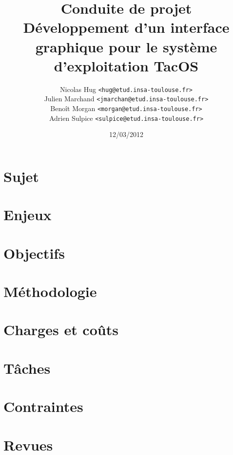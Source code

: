 \documentclass{article}
\title{Conduite de projet \\ Développement d'un interface graphique pour le système d'exploitation TacOS}
\author{Nicolas Hug \texttt{<hug@etud.insa-toulouse.fr>}\\
Julien Marchand \texttt{<jmarchan@etud.insa-toulouse.fr>}\\
Benoît Morgan \texttt{<morgan@etud.insa-toulouse.fr>}\\
Adrien Sulpice \texttt{<sulpice@etud.insa-toulouse.fr>}}
\date{12/03/2012}
\begin{document}
\maketitle

\newpage
\tableofcontents

\newpage


\section{Sujet}

\section{Enjeux}

\section{Objectifs}

\section{Méthodologie}

\section{Charges et coûts}

\section{Tâches}

\section{Contraintes}

\section{Revues}

\end{document}

